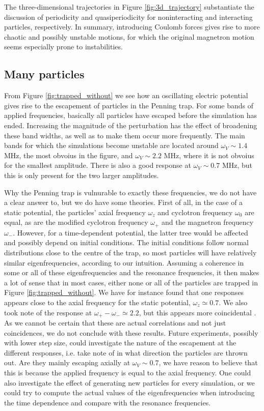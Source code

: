 The three-dimensional trajectories in Figure \ref{fig:3d_trajectory} substantiate the discussion of periodicity and quasiperiodicity for noninteracting and interacting particles, respectively. In summary, introducing Coulomb forces gives rise to more chaotic and possibly unstable motions, for which the original magnetron motion seems especially prone to instabilities.




\subsection{Many particles}


From Figure \ref{fig:trapped_without} we see how an oscillating electric potential gives rise to the escapement of particles in the Penning trap. For some bands of applied frequencies, basically all particles have escaped before the simulation has ended. Increasing the magnitude of the perturbation has the effect of broadening these band widths, as well as to make them occur more frequently. The main bands for which the simulations become unstable are located around $\omega_V \sim 1.4$ MHz, the most obvoius in the figure, and $\omega_V \sim 2.2$ MHz, where it is not obvoius for the smallest amplitude. There is also a good response at $\omega_V\sim 0.7$ MHz, but this is only present for the two larger amplitudes.

Why the Penning trap is vulnurable to exactly these frequencies, we do not have a clear answer to, but we do have some theories. First of all, in the case of a static potential, the particles' axial frequency $\omega_z$ and cyclotron frequency $\omega_0$ are equal, as are the modified cyclotron frequency $\omega_+$ and the magnetron frequency $\omega_-$. However, for a time-dependent potential, the latter tree would be affected and possibly depend on initial conditions. The initial conditions follow normal distributions close to the centre of the trap, so most particles will have relatively similar eigenfrequencies, according to our intuition. Assuming a coherence in some or all of these eigenfrequencies and the resonance frequencies, it then makes a lot of sense that in most cases, either none or all of the particles are trapped in Figure \ref{fig:trapped_without}. We have for instance found that one responses appears close to the axial frequency for the static potential, $\omega_z \simeq 0.7$. We also took note of the response at $\omega_+ - \omega_- \simeq 2.2$, but this appears more coincidental . As we cannot be certain that these are actual correlations and not just coincidences, we do not conclude with these results. Future experiments, possibly with lower step size, could investigate the nature of the escapement at the different responses, i.e. take note of in what direction the particles are thrown out. Are they mainly escaping axially at $\omega_V \sim 0.7$, we have reason to believe that this is because the applied frequency is equal to the axial frequency. One could also investigate the effect of generating new particles for every simulation, or we could try to compute the actual values of the eigenfrequencies when introducing the time dependence and compare with the resonance frequencies.


